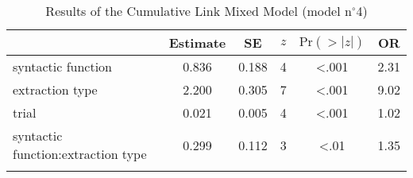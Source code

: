 \begin{table}
\begin{tabular}{l S[table-format=1.3] S[table-format=1.3] c S[table-format=<1.3] S[table-format=1.2]}
  \lsptoprule
 & {Estimate} & {SE} & {$z$} & {$\text{Pr}(>|z|)$} & {OR} \\ 
  \midrule
  syntactic function & 0.836 & 0.188 & 4 & <.001 & 2.31 \\ 
  extraction type & 2.200 & 0.305 & 7 & <.001 & 9.02 \\ 
  trial & 0.021 & 0.005 & 4 & <.001 & 1.02 \\ 
  syntactic function:extraction type & 0.299 & 0.112 & 3 & <.01 & 1.35 \\ 
   \lspbottomrule
\end{tabular}
\caption{Results of the Cumulative Link Mixed Model (model n$^{\circ}$4)}
\label{tab:exp10-m4}
\end{table}
